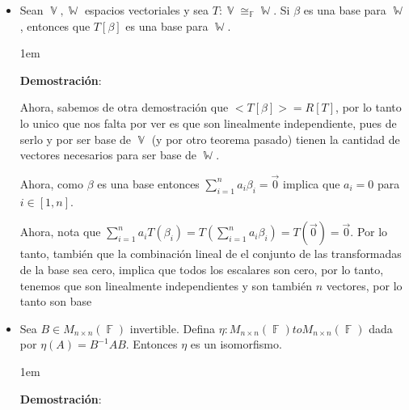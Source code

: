 \documentclass[12pt, fleqn]{report}                             %
\newenvironment{SmallIndentation}[1][0.75em]                    %
        {\begin{adjustwidth}{#1}{}\begin{footnotesize}}             %
        {\end{footnotesize}\end{adjustwidth}}                       %
\theoremstyle{break}                                            %
\DeclareMathOperator \GenericField {\mathbb{F}}                 %
\DeclareMathOperator \VectorSet    {\mathbb{V}}                 %
\DeclareMathOperator \SubVectorSet {\mathbb{W}}                 %
\begin{document}
\begin{itemize}
                    \item
                        Sean $\VectorSet, \SubVectorSet$ espacios vectoriales y sea 
                        $T: \VectorSet \cong_{\GenericField} \SubVectorSet$. Si $\beta$ es una base
                        para $\SubVectorSet$, entonces que $T[\beta]$ es una base para $\SubVectorSet$.

                        \begin{SmallIndentation}[1em]
                            \textbf{Demostración}:
                            
                            Ahora, sabemos de otra demostración que $<T[\beta]> = R[T]$, por lo tanto lo unico que nos
                            falta por ver es que son linealmente independiente, pues de serlo y por ser base de $\VectorSet$
                            (y por otro teorema pasado) tienen la cantidad de vectores necesarios para ser base
                            de $\SubVectorSet$.

                            Ahora, como $\beta$ es una base entonces $\sum_{i=1}^n a_i \beta_i = \vec 0$ implica
                            que $a_i = 0$ para $i \in [1, n]$.

                            Ahora, nota que $\sum_{i=1}^n a_i T(\beta_i) = T(\sum_{i=1}^n a_i \beta_i) = T(\vec 0) = \vec 0$.
                            Por lo tanto, también que la combinación lineal de el conjunto de las transformadas de la base
                            sea cero, implica que todos los escalares son cero, por lo tanto, tenemos que son linealmente
                            independientes y son también $n$ vectores, por lo tanto son base  
                        
                        \end{SmallIndentation}

                    \item
                        Sea $B \in M_{n \times n}(\GenericField)$ invertible. 
                        Defina $\eta : M_{n \times n}(\GenericField) to M_{n \times n}(\GenericField)$
                        dada por $\eta(A) = B^{-1}AB$. Entonces $\eta$ es un isomorfismo.

                        \begin{SmallIndentation}[1em]
                            \textbf{Demostración}:
                            

\end{SmallIndentation}
\end{itemize}
\end{document}
